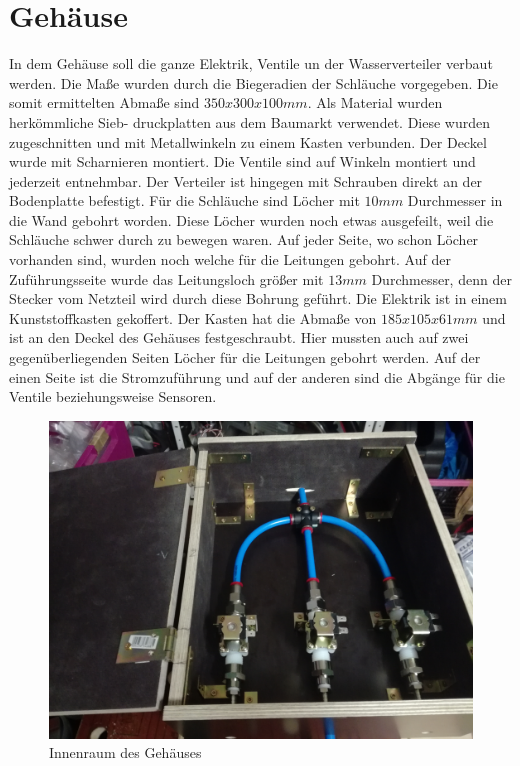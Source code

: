 \section{Gehäuse}
In dem Gehäuse soll die ganze Elektrik, Ventile un der Wasserverteiler verbaut werden.
Die Maße wurden durch die Biegeradien der Schläuche vorgegeben. Die somit ermittelten
Abmaße sind $350x300x100mm$. Als Material wurden herkömmliche Sieb-
druckplatten aus dem Baumarkt verwendet. Diese wurden zugeschnitten und mit Metallwinkeln
zu einem Kasten verbunden. Der Deckel wurde mit Scharnieren montiert. Die Ventile sind
auf Winkeln montiert und jederzeit entnehmbar. Der Verteiler
ist hingegen mit Schrauben direkt an der Bodenplatte befestigt. Für die Schläuche sind
Löcher mit $10mm$ Durchmesser in die Wand gebohrt worden. Diese Löcher wurden noch etwas
ausgefeilt, weil die Schläuche schwer durch zu bewegen waren.
Auf jeder Seite, wo schon Löcher vorhanden sind, wurden noch welche für die Leitungen gebohrt.
Auf der Zuführungsseite wurde das Leitungsloch größer mit $13mm$ Durchmesser, denn der Stecker
vom Netzteil wird durch diese Bohrung geführt.
Die Elektrik ist in einem Kunststoffkasten gekoffert. Der Kasten hat die Abmaße von $185x105x61mm$
und ist an den Deckel des Gehäuses festgeschraubt. Hier mussten auch auf zwei gegenüberliegenden
Seiten Löcher für die Leitungen gebohrt werden.
Auf der einen Seite ist die Stromzuführung und auf der anderen sind die Abgänge für die Ventile
beziehungsweise Sensoren.
\begin{figure}
    \centering
    \includegraphics[width=\textwidth]{silas/gehause}
    \caption{Innenraum des Gehäuses}
\end{figure}